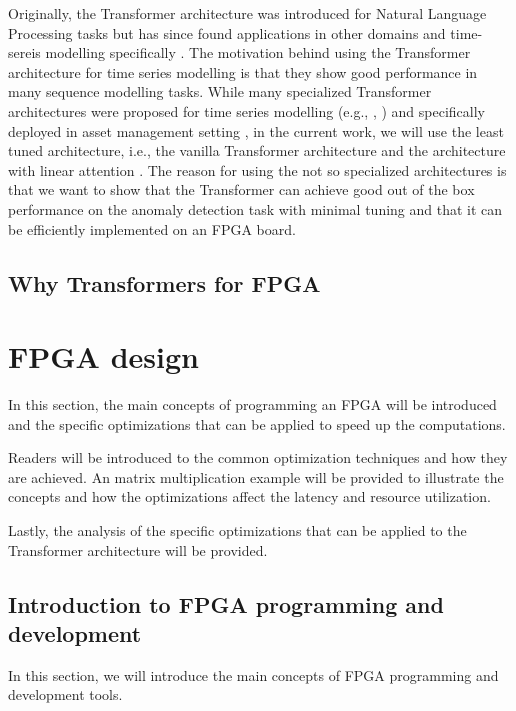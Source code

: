 \documentclass[a4paper, twoside]{report}
\theoremstyle{definition}
\numberwithin{equation}{section}
\begin{document}
Originally, the Transformer architecture was introduced for Natural Language Processing tasks \cite{1706.03762}
but has since found applications in other domains and time-sereis modelling specifically \cite{2202.07125}.
The motivation behind using the Transformer architecture for time series modelling is that
they show good performance in many sequence modelling tasks. While many
specialized Transformer architectures were proposed for time series modelling
(e.g., \cite{tuli2022tranad}, \cite{2205.13504}) and specifically deployed in
asset management setting \cite{Lezmi2023TimeSF},
in the current work, we will use the least tuned architecture, i.e., the vanilla Transformer architecture
and the architecture with linear attention \cite{2006.16236}. The reason for
using the not so specialized architectures is that we want to show that the Transformer
can achieve good out of the box performance on the anomaly detection task with minimal
tuning and that it can be efficiently implemented on an FPGA board.

\section{Why Transformers for FPGA}


\chapter{FPGA design} \label{sec:fpga_design}

In this section, the main concepts of programming an FPGA will be introduced
and the specific optimizations that can be applied to speed up the
computations.

Readers will be introduced to the common optimization techniques and how they
are achieved. An matrix multiplication example will be provided to illustrate the concepts and
how the optimizations affect the latency and resource utilization.

Lastly, the analysis of the specific optimizations that can be applied to the Transformer architecture
will be provided.

\section{Introduction to FPGA programming and development} \label{sec:fpga_development}

In this section, we will introduce the main concepts of FPGA programming and development tools.
\end{document}
